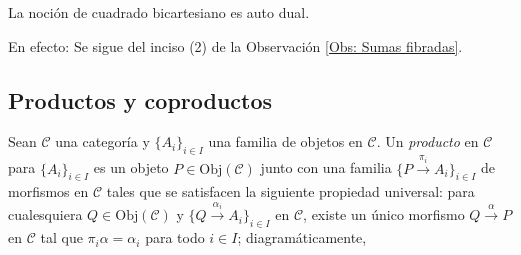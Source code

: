 \documentclass[tesis]{subfiles}
\begin{document}
\begin{Obs}
    La noción de cuadrado bicartesiano es auto dual.
    \vspace{1mm}

    En efecto: Se sigue del inciso (2) de la Observación \ref{Obs: Sumas fibradas}.
\end{Obs}

\subsection*{Productos y coproductos} \label{Mendoza-1.8}

\begin{Def} \label{Def: Producto}
    Sean $\mathscr{C}$ una categoría y $\{A_i\}_{i\in I}$ una familia de objetos en $\mathscr{C}$. Un \emph{producto} en $\mathscr{C}$ para $\{A_i\}_{i\in I}$ es un objeto $P\in\text{Obj}(\mathscr{C})$ junto con una familia $\{P\xrightarrow[]{\pi_i} A_i\}_{i\in I}$ de morfismos en $\mathscr{C}$ tales que se satisfacen la siguiente propiedad universal: para cualesquiera $Q\in\text{Obj}(\mathscr{C})$ y $\{Q\xrightarrow[]{\alpha_i} A_i\}_{i\in I}$ en $\mathscr{C}$, existe un único morfismo $Q\xrightarrow[]{\alpha} P$ en $\mathscr{C}$ tal que $\pi_i\alpha=\alpha_i$ para todo $i\in I$; diagramáticamente,
    \begin{center}
    \end{center}
\end{Def}
\end{document}
